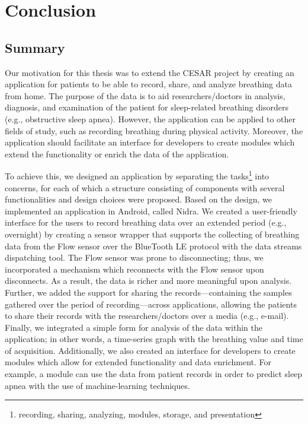 \chapter{Conclusion}

\section{Summary}
Our motivation for this thesis was to extend the CESAR project by creating an application for patients to be able to record, share, and analyze breathing data from home. The purpose of the data is to aid researchers/doctors in analysis, diagnosis, and examination of the patient for sleep-related breathing disorders (e.g., obstructive sleep apnea). However, the application can be applied to other fields of study, such as recording breathing during physical activity. Moreover, the application should facilitate an interface for developers to create modules which extend the functionality or enrich the data of the application.

To achieve this, we designed an application by separating the tasks\footnote{recording, sharing, analyzing, modules, storage, and presentation} into concerns, for each of which a structure consisting of components with several functionalities and design choices were proposed. Based on the design, we implemented an application in Android, called Nidra. We created a user-friendly interface for the users to record breathing data over an extended period (e.g., overnight) by creating a sensor wrapper that supports the collecting of breathing data from the Flow sensor over the BlueTooth LE protocol with the data streams dispatching tool. The Flow sensor was prone to disconnecting; thus, we incorporated a mechanism which reconnects with the Flow sensor upon disconnects. As a result, the data is richer and more meaningful upon analysis. Further, we added the support for sharing the records---containing the samples gathered over the period of recording---across applications, allowing the patients to share their records with the researchers/doctors over a media (e.g., e-mail). Finally, we integrated a simple form for analysis of the data within the application; in other words, a time-series graph with the breathing value and time of acquisition. Additionally, we also created an interface for developers to create modules which allow for extended functionality and data enrichment. For example, a module can use the data from patient records in order to predict sleep apnea with the use of machine-learning techniques.

